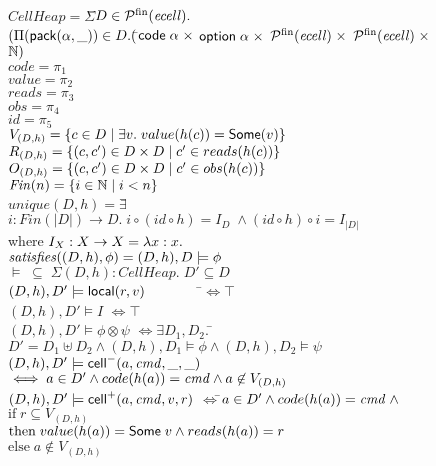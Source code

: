 \begin{figure}
\mbox{}
\begin{tabbing}
$CellHeap = \Sigma$\=$ D \in \mathcal{P}^{\mathrm{fin}}(\mathit{ecell}).$ \\
               \>$(\Pi (\mathsf{pack}({\alpha}, {\_})) \in D. ($\=${\mathsf{code}\;{\alpha}} \;\times$
                                         ${\mathsf{option}{\;\alpha}} \;\times$ 
                                         ${\mathcal{P}^{\mathrm{fin}}(\mathit{ecell})} \;\times$ 
                                         ${\mathcal{P}^{\mathrm{fin}}(\mathit{ecell})} \;\times$ 
                                         $\mathbb{N})$ \\[1em]
       

$code = \pi_1$ \\
$value = \pi_2$ \\
$reads = \pi_3$ \\
$obs = \pi_4$ \\
$id = \pi_5$ \\[1em]

$V_{(D, h)} = \{{{c \in D}\;|\;{\exists v.\; value(h(c)) = \mathsf{Some}(v)}}\}$ \\
$R_{(D, h)} = \{{{(c,c') \in D \times D}\;|\;{ c' \in reads(h(c)) }}\}$ \\
$O_{(D, h)} = \{{{(c,c') \in D \times D}\;|\;{ c' \in obs(h(c)) }}\}$ \\[1em]

$\mathit{Fin}(n) = \{{{ i \in \mathbb{N} }\;|\;{ i < n }}\}$ \\[1em]

$unique(D,h) = \exists$\=$i : Fin(|D|) \to D.\; i \circ (id \circ h) = I_D \; \land (id \circ h) \circ i = I_{|D|}$  \\
where $I_X : X \to X = \fun{x}{x}$ \\[1em]

$\mathit{satisfies}({(D,h)}, {\phi}) = (D,h), D \models \phi$ \\[1em]

$\models \;\subseteq\; \Sigma (D,h):CellHeap.\; D' \subseteq D$ \\[0.5em]

$(D,h), D' \models \mathsf{local}({r}, {v}) \qquad \qquad$\=$\iff \top$ \\
$(D,h), D' \models I$                            \>$\iff \top$ \\
$(D,h), D' \models \phi \otimes \psi$            \>$\iff \exists D_1, D_2.\;$\=$D' = D_1 \uplus D_2 
                                                      \land (D,h), D_1 \models \phi
                                                      \land (D,h), D_2 \models \psi$ \\
$(D,h), D' \models \mathsf{cell}^{-}({a}, {\mathit{cmd}}, {\_}, {\_})$               \>$\iff a \in D' \land code(h(a)) = \mathit{cmd} \land a \not \in V_{(D,h)}$ \\
$(D,h), D' \models \mathsf{cell}^{+}({a}, {\mathit{cmd}}, {v}, {r})$         \>$\iff $\=$ a \in D' \land code(h(a)) = \mathit{cmd} \;\land$ \\
\>      \>$\mathrm{if}\;r \subseteq V_{(D,h)}$ \\
\>      \>$\mathrm{then}\;value(h(a)) = \mathsf{Some}\;v \land reads(h(a)) = r$ \\
\>      \>$\mathrm{else}\;a \not\in V_{(D,h)}$\\[1em]
 


\end{tabbing}
\end{figure}
